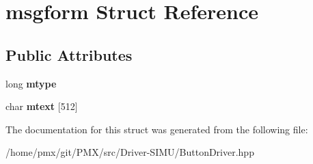 \hypertarget{structmsgform}{}\section{msgform Struct Reference}
\label{structmsgform}
\subsection*{Public Attributes}
\begin{DoxyCompactItemize}
\item 
\mbox{\label{structmsgform_a58c7bc78ec771f070be4a3e1dba504b0}} 
long {\bfseries mtype}
\item 
\mbox{\label{structmsgform_a15fad8e8839b0c73523ad0b2d044d903}} 
char {\bfseries mtext} \mbox{[}512\mbox{]}
\end{DoxyCompactItemize}


The documentation for this struct was generated from the following file\+:\begin{DoxyCompactItemize}
\item 
/home/pmx/git/\+P\+M\+X/src/\+Driver-\/\+S\+I\+M\+U/Button\+Driver.\+hpp\end{DoxyCompactItemize}
